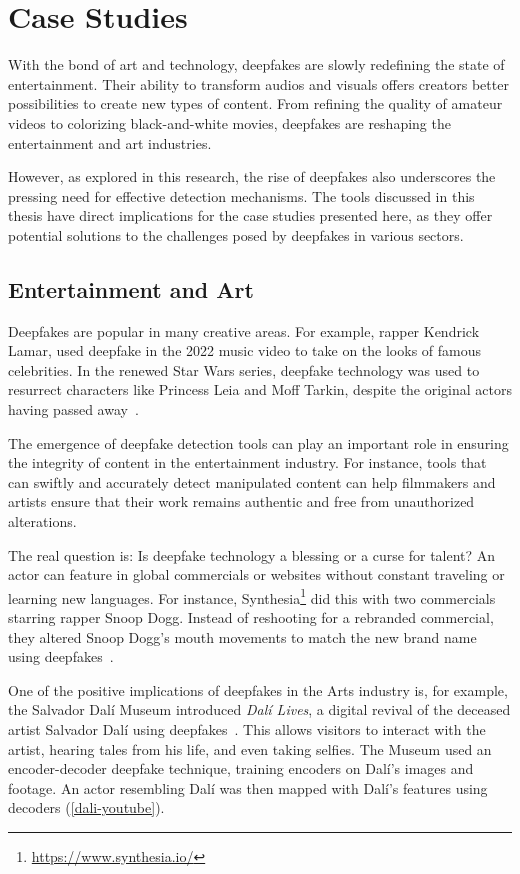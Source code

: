 
\chapter{Case Studies}\label{chapter:applications}
With the bond of art and technology, deepfakes are slowly redefining the state of
entertainment. Their ability to transform audios and visuals offers creators better
possibilities to create new types of content. From refining the quality of amateur
videos to colorizing black-and-white movies, deepfakes are reshaping the entertainment
and art industries.

However, as explored in this research, the rise of deepfakes also underscores the pressing
need for effective detection mechanisms. The tools discussed in this thesis have direct
implications for the case studies presented here, as they offer potential solutions
to the challenges posed by deepfakes in various sectors.


\section{Entertainment and Art}
Deepfakes are popular in many creative areas. For example, rapper Kendrick Lamar,
used deepfake in the 2022 music video to take on the looks of famous celebrities. In the
renewed Star Wars series, deepfake technology was used to resurrect characters like
Princess Leia and Moff Tarkin, despite the original actors having passed away~\cite{motion-analysis}.

The emergence of deepfake detection tools can play an important role in ensuring the 
integrity of content in the entertainment industry. For instance, tools that can swiftly 
and accurately detect manipulated content can help filmmakers and artists ensure that 
their work remains authentic and free from unauthorized alterations.

The real question is: Is deepfake technology a blessing or a curse for talent?
An actor can feature in global commercials or websites
without constant traveling or learning new languages. For instance, Synthesia\footnote{\url{https://www.synthesia.io/}}
did this with two commercials starring rapper Snoop Dogg. Instead of reshooting for a
rebranded commercial, they altered Snoop Dogg's mouth movements to match the new brand
name using deepfakes~\cite{wipo-magazine}.

One of the positive implications of deepfakes in the Arts industry is, for example, the Salvador
Dalí Museum introduced \textit{Dalí Lives}, a digital revival of the deceased artist
Salvador Dalí using deepfakes~\cite{salvador-dali, salvador-dali2}.
This allows visitors to interact with the artist, hearing tales from his life, and
even taking selfies. The Museum used an encoder-decoder deepfake technique, training encoders on Dalí's
images and footage. An actor resembling Dalí was then mapped with Dalí's features using
decoders (\autoref{dali-youtube}).


